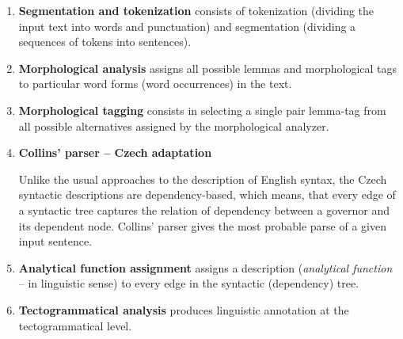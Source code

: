 \begin{enumerate}
	\item \textbf{Segmentation and tokenization} consists of tokenization (dividing the input text into words and  punctuation) and segmentation (dividing a sequences of tokens into sentences).
	
	\item \textbf{Morphological analysis} assigns all possible lemmas and morphological tags to particular word forms (word occurrences) in the text.
	
	\item \textbf{Morphological tagging} consists in selecting a single pair lemma-tag from all possible alternatives assigned by the morphological analyzer.
	
	\item \textbf{Collins' parser -- Czech adaptation} \citep{biblio:collinshbrt_1999}
		
Unlike the usual approaches to the description of English syntax, the Czech syntactic descriptions are dependency-based, which means, that every edge of a syntactic tree captures the relation of dependency between a governor and its dependent node. Collins' parser gives the most probable parse of a given input sentence.
	
	\item \textbf{Analytical function assignment} assigns a description (\emph{analytical function} -- in linguistic sense) to every edge in the syntactic (dependency) tree.
	
	\item \textbf{Tectogrammatical analysis} \citep{biblio:KlTransformationBasedTectogrammatical2006} produces linguistic annotation at the tectogrammatical level.

	 
\end{enumerate}





